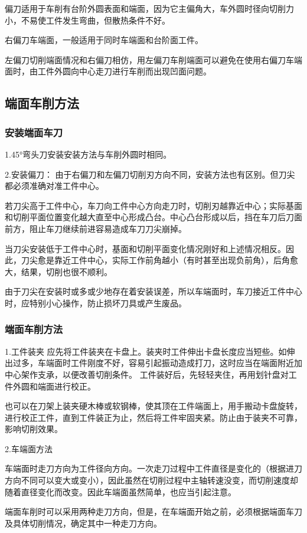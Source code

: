 \documentclass{ctexbook}
\begin{document}
偏刀适用于车削有台阶外圆表面和端面，因为它主偏角大，车外圆时径向切削力小，不易使工件发生弯曲，但散热条件不好。

右偏刀车端面，一般适用于同时车端面和台阶面工件。

左偏刀切削端面情况和右偏刀相仿，用左偏刀车削端面可以避免在使用右偏刀车端面时，由工件外圆向中心走刀进行车削而出现凹面问题。
\subsection{端面车削方法}
\subsubsection{安装端面车刀}
1.45°弯头刀安装安装方法与车削外圆时相同。

2.安装偏刀：
由于右偏刀和左偏刀切削刃方向不同，安装方法也有区别。但刀尖都必须准确对准工件中心。

若刀尖高于工件中心，车刀向工件中心方向走刀时，切削刃越靠近中心；实际基面和切削平面位置变化越大直至中心形成凸台。中心凸台形成以后，挡在车刀后刀面前方，阻止车刀继续前进容易造成车刀刀尖崩掉。

当刀尖安装低于工件中心时，基面和切削平面变化情况刚好和上述情况相反。因此，刀尖愈是靠近工件中心，实际工作前角越小（有时甚至出现负前角），后角愈大，结果，切削也很不顺利。

由于刀尖在安装时或多或少地存在着安装误差，所以车端面时，车刀接近工件中心时，应特别小心操作，防止损坏刀具或产生废品。
\subsubsection{端面车削方法}
1.工件装夹 应先将工件装夹在卡盘上。装夹时工件伸出卡盘长度应当短些。如伸出过多，车端面时工件刚度不好，容易引起振动造成打刀，这时应当在端面附近加中心架作支承，以便改善切削条件。
工件装好后，先轻轻夹住，再用划针盘对工件外圆和端面进行校正。

也可以在刀架上装夹硬木棒或软钢棒，使其顶在工件端面上，用手搬动卡盘旋转，进行校正工件，直到工件装正为止，然后将工件牢固夹紧。防止由于装夹不可靠，影响切削效果。

2.车端面方法

车端面时走刀方向为工件径向方向。一次走刀过程中工件直径是变化的（根据进刀方向不同可以变大或变小），因此虽然在切削过程中主轴转速没变，而切削速度却随着直径变化而改变。因此车端面虽然简单，也应当引起注意。

端面车削时可以采用两种走刀方向，但是，在车端面开始之前，必须根据端面车刀及具体切削情况，确定其中一种走刀方向。
\end{document}
